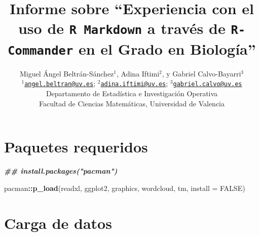 \documentclass[
]{article}
\title{Informe sobre ``Experiencia con el uso de \texttt{R Markdown} a
través de \texttt{R-Commander} en el Grado en Biología''}
\author{\Large Miguel Ángel Beltrán-Sánchez\(^1\), Adina Iftimi\(^2\), y
Gabriel Calvo-Bayarri\(^3\)\\
\(^1\)\href{mailto:angel.beltran@uv.es}{\nolinkurl{angel.beltran@uv.es}};
\(^2\)\href{mailto:adina.iftimi@uv.es}{\nolinkurl{adina.iftimi@uv.es}};
\(^3\)\href{mailto:gabriel.calvo@uv.es}{\nolinkurl{gabriel.calvo@uv.es}}\\
Departamento de Estadística e Investigación Operativa\\
Facultad de Ciencias Matemáticas, Universidad de Valencia}
\date{}
\newenvironment{Shaded}{\begin{snugshade}}{\end{snugshade}}
\newcommand{\AttributeTok}[1]{\textcolor[rgb]{0.13,0.29,0.53}{#1}}
\newcommand{\ConstantTok}[1]{\textcolor[rgb]{0.56,0.35,0.01}{#1}}
\newcommand{\DocumentationTok}[1]{\textcolor[rgb]{0.56,0.35,0.01}{\textbf{\textit{#1}}}}
\newcommand{\FunctionTok}[1]{\textcolor[rgb]{0.13,0.29,0.53}{\textbf{#1}}}
\newcommand{\NormalTok}[1]{#1}
\newcommand{\SpecialCharTok}[1]{\textcolor[rgb]{0.81,0.36,0.00}{\textbf{#1}}}
\begin{document}
\maketitle

\hypertarget{paquetes-requeridos}{%
\section{Paquetes requeridos}\label{paquetes-requeridos}}

\begin{Shaded}
\begin{Highlighting}[]
\DocumentationTok{\#\# install.packages("pacman")}

\NormalTok{pacman}\SpecialCharTok{::}\FunctionTok{p\_load}\NormalTok{(readxl, ggplot2, graphics, wordcloud, tm, }\AttributeTok{install =} \ConstantTok{FALSE}\NormalTok{)}
\end{Highlighting}
\end{Shaded}

\hypertarget{carga-de-datos}{%
\section{Carga de datos}\label{carga-de-datos}}
\end{document}
